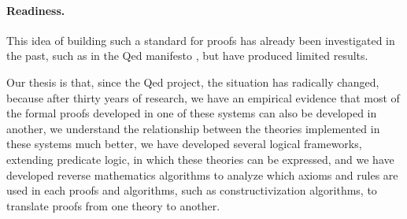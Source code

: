 \paragraph{Readiness.}
This idea of building such a standard for proofs has already been
investigated in the past, such as in the Qed manifesto \cite{Qed94}, but
have produced limited results.

Our thesis is that, since the
Qed project, the situation has radically changed, because after
thirty years of research, we have an empirical evidence that most of
the formal proofs developed in one of these systems can also be
developed in another, we understand the relationship between the
theories implemented in these systems much better, we have developed
several logical frameworks, extending predicate logic, in which these
theories can be expressed, and we have developed reverse mathematics
algorithms to analyze which axioms and rules are used in each proofs
and algorithms, such as constructivization algorithms, to translate
proofs from one theory to another.
